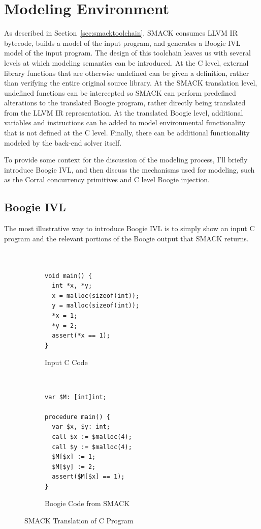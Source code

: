 \section{Modeling Environment}\label{sec:modelingenvironment}
As described in Section~\ref{sec:smacktoolchain}, SMACK consumes LLVM
IR bytecode, builds a model of the input program, and generates a
Boogie IVL model of the input program.  The design of this toolchain
leaves us with several levels at which modeling semantics can be
introduced. At the C level, external library functions that are
otherwise undefined can be given a definition, rather than verifying
the entire original source library. At the SMACK translation level,
undefined functions can be intercepted so SMACK can perform predefined
alterations to the translated Boogie program, rather directly being
translated from the LLVM IR representation.  At the translated Boogie
level, additional variables and instructions can be added to model
environmental functionality that is not defined at the C
level. Finally, there can be additional functionality modeled by the
back-end solver itself. 

To provide some context for the discussion of the modeling process,
I'll briefly introduce Boogie IVL, and then discuss the mechanisms
used for modeling, such as the Corral concurrency primitives and C
level Boogie injection.

\subsection{Boogie IVL}
The most illustrative way to introduce Boogie IVL is to simply show an
input C program and the relevant portions of the Boogie output that
SMACK returns. 
\begin{figure}[!ht]
\centering
\begin{subfigure}[b]{.45\textwidth}
\centering
\begin{lstlisting}


void main() {
  int *x, *y;
  x = malloc(sizeof(int));
  y = malloc(sizeof(int));
  *x = 1;
  *y = 2;
  assert(*x == 1);
}
\end{lstlisting}
\caption{Input C Code}\label{fig:cToBoogie_a}
\end{subfigure}
~
\begin{subfigure}[b]{.45\textwidth}
\centering
\begin{lstlisting}[language=boogie]
var $M: [int]int;

procedure main() {
  var $x, $y: int;
  call $x := $malloc(4);
  call $y := $malloc(4);
  $M[$x] := 1;
  $M[$y] := 2;
  assert($M[$x] == 1);
}
\end{lstlisting}
\caption{Boogie Code from SMACK}\label{fig:cToBoogie_b}
\end{subfigure}
\caption{SMACK Translation of C Program}\label{fig:cToBoogie}
\end{figure}

